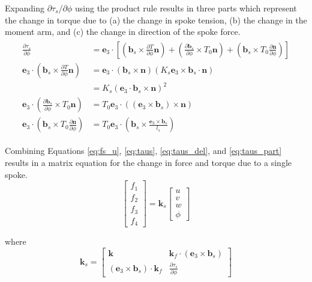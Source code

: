 \documentclass[../thesis.tex]{subfiles}
\newcommand{\eh}{\mathbf{e}_3}
\newcommand{\n}{\mathbf{n}}
\newcommand{\bs}{\mathbf{b}_s}
\begin{document}
Expanding $\partial\tau_s/\partial\phi$ using the product rule results in three parts which represent the change in torque due to (a) the change in spoke tension, (b) the change in the moment arm, and (c) the change in direction of the spoke force.
\begin{align}
\label{eq:taus_part}
\begin{split}
\frac{\partial\tau_s}{\partial\phi} &= \eh\cdot \left[
    \left(\bs\times \frac{\partial T}{\partial\phi}\n\right) +
    \left( \frac{\partial\bs}{\partial\phi} \times T_0\n \right) +
    \left( \bs \times T_0 \frac{\partial\n}{\partial\phi} \right) \right]\\
\eh\cdot\left(\bs\times \frac{\partial T}{\partial\phi}\n\right) &=
    \eh\cdot(\bs\times\n)\left(K_s\eh\times\bs\cdot\n\right)\\
    &= K_s(\eh\cdot\bs\times\n)^2\\
\eh\cdot\left( \frac{\partial\bs}{\partial\phi} \times T_0\n \right) &=
    T_0\eh\cdot((\eh\times\bs)\times\n)\\
\eh\cdot\left( \bs \times T_0 \frac{\partial\n}{\partial\phi} \right) &=
    T_0\eh\cdot\left(\bs \times \frac{\eh\times\bs}{l_s} \right)
\end{split}
\end{align}

Combining Equations \eqref{eq:fs_u}, \eqref{eq:taus}, \eqref{eq:taus_del}, and \eqref{eq:taus_part} results in a matrix equation for the change in force and torque due to a single spoke.
\begin{equation}
\begin{bmatrix}
f_1\\f_2\\f_3\\f_4
\end{bmatrix}
=\mathbf{k}_s
\begin{bmatrix}
u\\v\\w\\\phi
\end{bmatrix}
\end{equation}

where
\begin{equation}
\label{eq:k_s}
\mathbf{k}_s =
\begin{bmatrix}
\mathbf{k}                      & \mathbf{k}_f\cdot(\eh\times\bs)\\
(\eh\times\bs)\cdot\mathbf{k}_f & \frac{\partial\tau_s}{\partial\phi}
\end{bmatrix}
\end{equation}
\end{document}
